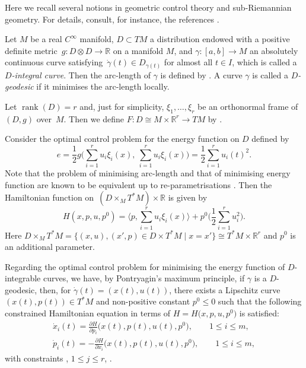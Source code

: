\documentclass[11pt]{article}
\numberwithin{equation}{section}
\numberwithin{equation}{section}
\theoremstyle{definition}
\newcommand{\R}{\mathbb{R}}
\newcommand{\0}{\boldsymbol{0}}
\newcommand{\pa}{\partial}
\newcommand{\rank}{\operatorname{rank}}
\begin{document}
Here we recall several notions in geometric control theory and sub-Riemannian geometry.
For details, consult, for instance, the references \cite{AS, BC, Montgomery0, Montgomery}.

Let $M$ be a real $C^\infty$ manifold,
$D \subset TM$ a distribution endowed with a positive definite met\-ric~${g\colon D\otimes D \to \R}$
on a manifold $M$, and $\gamma\colon [a, b] \to M$ an absolutely continuous curve sat\-is\-fy\-ing~$\dot{\gamma}(t) \in D_{\gamma(t)}$
for almost all $t \in I$, which is called a {\it $D$-integral curve}.
Then the arc-length of $\gamma$ is defined by
.
A curve $\gamma$ is called a {\it $D$-geodesic} if it minimises the arc-length locally.

Let $\rank(D) = r$ and, just for simplicity, $\xi_1, \dots, \xi_r$ be an orthonormal frame of $(D, g)$ over~$M$.
Then we define $F\colon D \cong M\times \R^r \to TM$ by .

Consider the optimal control problem for the energy function on $D$ defined by
\[
e = \frac{1}{2} g\Biggl(\sum_{i=1}^r u_i \xi_i(x), \ \sum_{i=1}^r u_i \xi_i(x)\Biggr) = \frac{1}{2} \sum_{i=1}^r u_i(t)^2.
\]
Note that the problem of minimising arc-length and that of minimising energy function are known to be equivalent
up to re-parametrisations \cite{AS, Montgomery}.
Then the Hamiltonian function on~$(D \times_M T^*M) \times \R$ is given by
\[
H(x, p, u, p^0) = \Biggl\langle p, \sum_{i=1}^r u_i\xi_i(x)\Biggr\rangle + p^0\Biggl(\frac{1}{2}\sum_{i=1}^r u_i^2\Biggr).
\]
Here $D \times_M T^*M = \{ (x, u), (x', p) \in D\times T^*M \mid x = x'\} \cong T^*M \times \R^r$ and $p^0$ is an additional parameter.

Regarding the optimal control problem for minimising the energy function of $D$-integrable curves,
we have, by Pontryagin's maximum principle,
if $\gamma$ is a $D$-geodesic, then, for $\dot{\gamma}(t) = (x(t), u(t))$,
there exists a Lipschitz curve $(x(t), p(t)) \in T^*M$ and non-positive constant $p^0 \leq 0$
such that the following constrained Hamiltonian equation in terms of $H = H\bigl(x, p, u, p^0\bigr)$
is satisfied:
\begin{gather*}
\dot{x}_i(t) = \frac{\pa H}{\pa p_i}\bigl(x(t), p(t), u(t), p^0\bigr), \qquad 1 \leq i \leq m,
\\
\dot{p}_i(t) = - \frac{\pa H}{\pa x_i}\bigl(x(t), p(t), u(t), p^0\bigr), \qquad 1 \leq i \leq m,
\end{gather*}
with constraints
\smash{$\frac{\pa H}{\pa u_j}\bigl(x(t), p(t), u(t), p^0\bigr) = 0$}, $1 \leq j \leq r$, .
\end{document}
